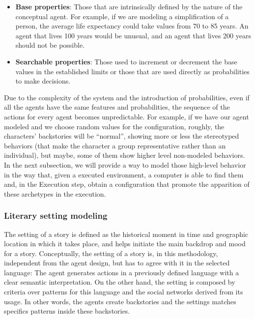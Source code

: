 \documentclass{sig-alternate}
\begin{document}
\begin{itemize}
\item \textbf{Base properties}: Those that are intrinsically defined by the nature of the conceptual agent. For example, if we are modeling a simplification of a person, the average life expectancy could take values from 70 to 85 years. An agent that lives 100 years would be unusual, and an agent that lives 200 years should not be possible.
\item \textbf{Searchable properties}: Those used to increment or decrement the base values in the established limits or those that are used directly as probabilities to make decisions.
\end{itemize}


Due to the complexity of the system and the introduction of probabilities, even if all the agents have the same features and probabilities, the sequence of the actions for every agent becomes unpredictable. For example, if we have our agent modeled and we choose random values for the configuration, roughly, the characters' backstories will be ``normal'', showing more or less the stereotyped behaviors (that make the character a group representative rather than an individual), but maybe, some of them show higher level non-modeled behaviors. In the next subsection, we will provide a way to model those high-level behavior in the way that, given a executed environment, a computer is able to find them 
and, in the Execution step, obtain a configuration that promote the apparition of these archetypes in the execution.

\subsubsection{Literary setting modeling}


The setting of a story is defined as the historical moment in time and geographic location in which it takes place, and helps initiate the main backdrop and mood for a story.
Conceptually, the setting of a story is, in this methodology, independent from the agent design, but has to agree with it in the selected language: 
The agent generates actions in a previously defined language with a clear semantic interpretation. On the other hand, the setting is composed by criteria over patterns for this language and the social networks derived from its usage. In other words, the agents create backstories and the settings matches specifics patterns inside these backstories.
\end{document}
